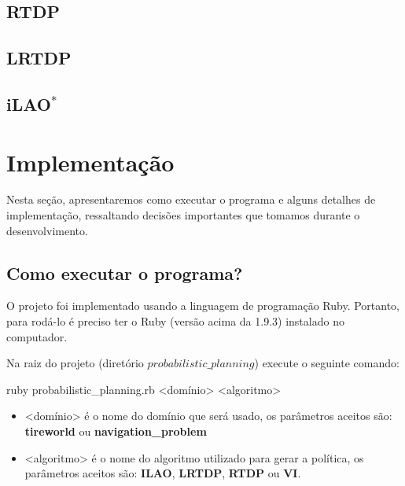 \documentclass[12pt,a4paper]{article}
\begin{document}
\subsection{RTDP}\label{rtdp}


\subsection{LRTDP}\label{lrtdp}


\subsection{iLAO$^*$}\label{ilao}



\section{Implementação}\label{implementacao}

Nesta seção, apresentaremos como executar o programa e alguns detalhes de implementação, ressaltando decisões importantes que tomamos durante o desenvolvimento.

\subsection{Como executar o programa?}\label{implementacao:execucao}

O projeto foi implementado usando a linguagem de programação Ruby. Portanto, para rodá-lo é preciso ter o Ruby (versão acima da 1.9.3) instalado no computador. 

Na raiz do projeto (diretório $probabilistic\_planning$) execute o seguinte comando:

\begin{center}
{ruby probabilistic\_planning.rb <domínio> <algoritmo>}
\end{center}

\begin{itemize}
\item <domínio> é o nome do domínio que será usado, os parâmetros aceitos são: \textbf{tireworld} ou \textbf{navigation\_problem}

\item <algoritmo> é o nome do algoritmo utilizado para gerar a política, os parâmetros aceitos são: \textbf{ILAO}, \textbf{LRTDP}, \textbf{RTDP} ou \textbf{VI}.
\end{itemize}
\end{document}
